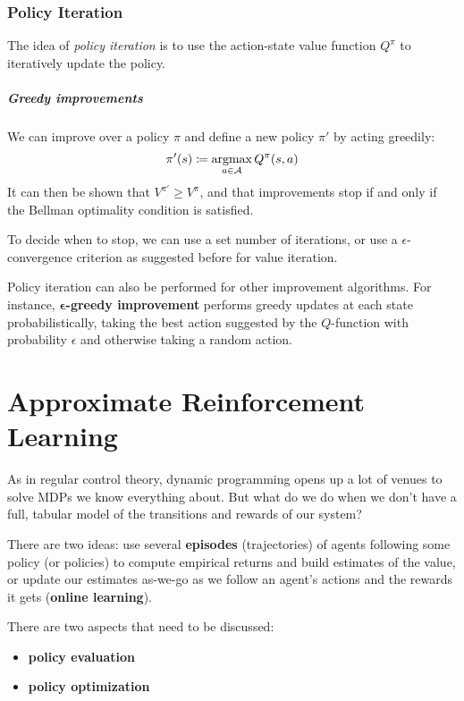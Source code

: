 \documentclass[../course-notes.tex]{subfiles}
\begin{document}
\subsection{Policy Iteration}

The idea of \textit{policy iteration} is to use the action-state value function $Q^\pi$ to iteratively update the policy.

\paragraph{Greedy improvements} We can improve over a policy $\pi$ and define a new policy $\pi'$ by acting greedily:
\[
	\pi'(s) \coloneqq \operatorname*{\mathrm{argmax}}_{a\in\mathcal{A}} Q^\pi(s,a)
\]
It can then be shown that $V^{\pi'} \geq V^{\pi}$, and that improvements stop if and only if the Bellman optimality condition is satisfied.

To decide when to stop, we can use a set number of iterations, or use a $\epsilon$-convergence criterion as suggested before for value iteration.


Policy iteration can also be performed for other improvement algorithms. For instance, \textbf{$\boldsymbol\epsilon$-greedy improvement} performs greedy updates at each state probabilistically, taking the best action suggested by the $Q$-function with probability $\epsilon$ and otherwise taking a random action.





\chapter{Approximate Reinforcement Learning}

As in regular control theory, dynamic programming opens up a lot of venues to solve MDPs we know everything about. But what do we do when we don't have a full, tabular model of the transitions and rewards of our system?

There are two ideas: use several \textbf{\bluefont episodes} (trajectories) of agents following some policy (or policies) to compute empirical returns and build estimates of the value, or update our estimates as-we-go as we follow an agent's actions and the rewards it gets (\textbf{\bluefont online learning}).


There are two aspects that need to be discussed:
\begin{itemize}
	\item \textbf{policy evaluation}
	\item \textbf{policy optimization}
\end{itemize}
\end{document}
